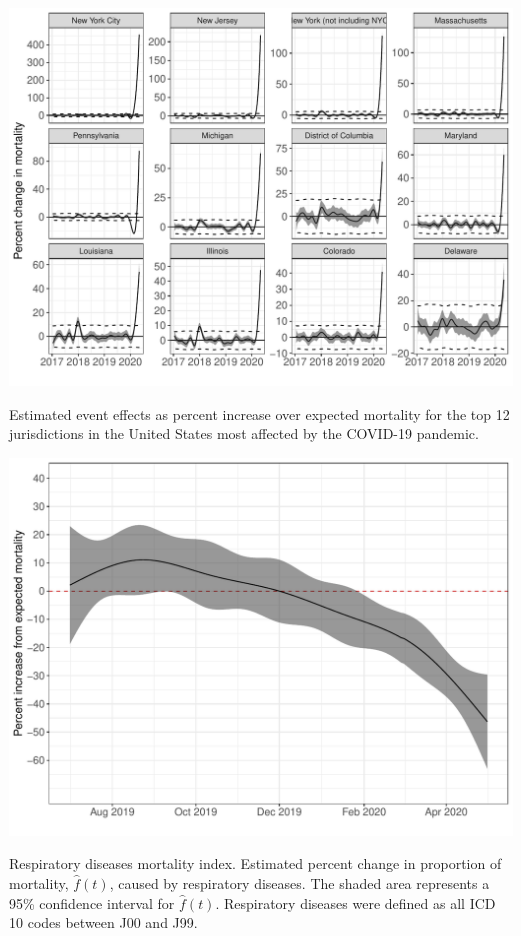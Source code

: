 \documentclass[11pt]{article}
\begin{document}
\begin{suppfigure}[ht]
	\centering
	\includegraphics[width=1\linewidth]{figs/supp-figure-5.pdf} 
	\caption{Estimated event effects as percent increase over expected mortality for the top 12 jurisdictions in the United States most affected by the COVID-19 pandemic.}
	\label{supp-fig:covid19-states}
\end{suppfigure}

\begin{suppfigure}[ht]
	\centering
	\includegraphics[width=1\linewidth]{figs/supp-figure-6.pdf} 
	\caption{Respiratory diseases mortality index. Estimated percent change in proportion of mortality, $\hat{f}(t)$, caused by respiratory diseases. The shaded area represents a 95\% confidence interval for $\hat{f}(t)$. Respiratory diseases were defined as all ICD 10 codes between J00 and J99.}
	\label{supp-fig:respiratory-index-pr}
\end{suppfigure}
\end{document}
